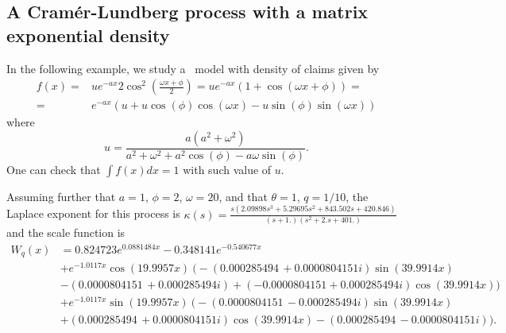 \newpage

\subsection{A Cram\'{e}r-Lundberg process with a matrix exponential density} \label{e:MatExpCos}

In the following example, we study a \CL\ model with density of claims given by
\begin{align*}
f(x)=& u e^{-a x} 2 \cos ^{2}\left(\frac{\omega x+\phi}{2}\right)=u e^{-a x}(1+\cos (\omega x+\phi))=\\=& e^{-a x}(u+u \cos (\phi) \cos (\omega x)-u \sin (\phi) \sin (\omega x))
\end{align*}
where
\[u=\frac{a\left(a^{2}+\omega^{2}\right)}{a^{2}+\omega^{2}+a^{2} \cos (\phi)-a \omega \sin (\phi)}. \]
One can check that $\int f(x) d x=1$ with such value of $u$.

Assuming further that $a=1$, $\phi=2$, $\omega=20$, and that $\theta=1$, $q=1/10$, the Laplace exponent for this process is
$\kappa(s) = \frac{s \left(2.09898 s^3+5.29695 s^2+843.502 s+420.846\right)}{(s+1.) \left(s^2+2. s+401.\right)}$ and the scale function is
\begin{align*}
W_q(x)  &= 0.824723 e^{0.0881484 x} -0.348141 e^{-0.540677 x} \\
   &+e^{-1.0117 x} \cos (19.9957 x) ~\Big( -(0.000285494\, +0.0000804151 i) \sin (39.9914 x)\\
   &-(0.0000804151\, +0.000285494 i)+(-0.0000804151+0.000285494 i) \cos (39.9914 x) \Big)\\
   &+e^{-1.0117 x} \sin (19.9957 x) ~\Big( -(0.0000804151\, -0.000285494 i) \sin (39.9914 x) \\
   & +(0.000285494\, +0.0000804151 i) \cos (39.9914 x)-(0.000285494\, -0.0000804151 i) \Big).
\end{align*}

